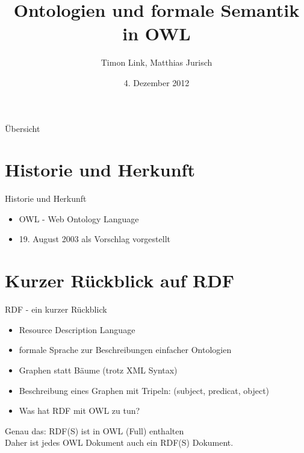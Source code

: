 \documentclass{beamer}
\title[OWL]{Ontologien und formale Semantik in OWL}
\author{Timon Link, Matthias Jurisch}
\date{4. Dezember 2012}
\begin{document}
\begin{frame}
\titlepage
\end{frame}

\begin{frame}{Übersicht}
\tableofcontents
\end{frame}

\section{Historie und Herkunft}
\begin{frame}{Historie und Herkunft}
	\begin{itemize}
	\item OWL - Web Ontology Language
	\item 19. August 2003 als Vorschlag vorgestellt
	\end{itemize}
\end{frame}

\section{Kurzer Rückblick auf RDF}
\begin{frame}{RDF - ein kurzer Rückblick}
\begin{itemize}
	\item \alert{R}esource \alert{D}escription \alert{L}anguage
	\item formale Sprache zur Beschreibungen einfacher Ontologien
	\item Graphen statt Bäume (trotz XML Syntax)
	\item Beschreibung eines Graphen mit Tripeln: (subject, predicat, object)
	\item Was hat RDF mit OWL zu tun?
\end{itemize}
\begin{block}{Genau das:}
	RDF(S) ist in OWL (Full) enthalten\\
	Daher ist jedes OWL Dokument auch ein RDF(S) Dokument.
\end{block}
\end{frame}

\end{document}
